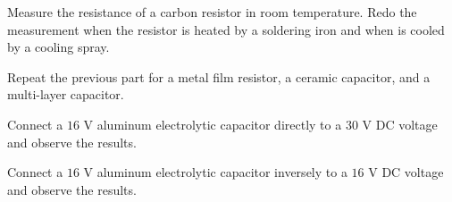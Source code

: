 \documentclass[11pt]{article}
\begin{document}
\begin{question}


    \begin{subquestion}{Measure the resistance of a carbon resistor in room temperature. Redo the measurement when the resistor is heated by a soldering iron and when is cooled by a cooling spray. }
        \answer{}
    \end{subquestion}

    \begin{subquestion}{Repeat the previous part for a metal film resistor, a ceramic capacitor, and a multi-layer capacitor. }
        \answer{}
    \end{subquestion}

\end{question}


\begin{question}


    \answer{}

\end{question}


\begin{question}


    \begin{subquestion}{Connect a $16$ V aluminum electrolytic capacitor directly to a $30$ V DC voltage and observe the results.}
        \answer{}
    \end{subquestion}

    \begin{subquestion}{Connect a $16$ V aluminum electrolytic capacitor inversely to a $16$ V DC voltage and observe the results.}
        \answer{}
    \end{subquestion}

\end{question}
\end{document}
